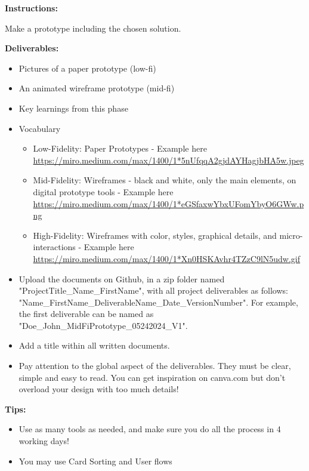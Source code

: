 \makeheaderfiles

\textbf{Instructions:}

Make a prototype including the chosen solution.

\textbf{Deliverables:}

\begin{itemize}
\item Pictures of a paper prototype (low-fi)
\item An animated wireframe prototype (mid-fi)
\item Key learnings from this phase
\item Vocabulary
\begin{itemize}
\item Low-Fidelity: Paper Prototypes - Example here \url{https://miro.medium.com/max/1400/1*5nUfqqA2gjdAYHagjbHA5w.jpeg}
\item Mid-Fidelity: Wireframes - black and white, only the main elements, on digital prototype tools - Example here \url{https://miro.medium.com/max/1400/1*eGSfaxwYbxUFomYbyO6GWw.png}
\item High-Fidelity: Wireframes with color, styles, graphical details, and micro-interactions - Example here \url{https://miro.medium.com/max/1400/1*Xn0HSKAvhr4TZzC9lN5udw.gif}
\end{itemize}
\item Upload the documents on Github, in a zip folder named "ProjectTitle\_Name\_FirstName", with all project deliverables as follows: "Name\_FirstName\_DeliverableName\_Date\_VersionNumber".  For example, the first deliverable can be named as "Doe\_John\_MidFiPrototype\_05242024\_V1".
\item Add a title within all written documents.
\item Pay attention to the global aspect of the deliverables. They must be clear, simple and easy to read. You can get inspiration on canva.com but don't overload your design with too much details!
\end{itemize}

\textbf{Tips:}

\begin{itemize}
\item Use as many tools as needed, and make sure you do all the process in 4 working days!
\item You may use Card Sorting and User flows
\end{itemize}

